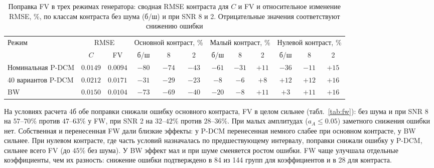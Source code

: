 \begin{table}[!ht]
\captionsetup{justification=raggedright}
\caption{Поправка FV в трех режимах генератора: сводная RMSE контраста для $C$ и FV и относительное изменение RMSE, \%, по классам контраста без шума (б/ш) и при SNR 8 и 2. Отрицательные значения соответствуют снижению ошибки}
\label{tab:fv}
\centering
\footnotesize
\setlength{\tabcolsep}{3pt}
\begin{tabular}{lccccccccccc}
\hline
\multirow{2}{*}{Режим} & \multicolumn{2}{c}{RMSE} & \multicolumn{3}{c}{Основной контраст, \%} & \multicolumn{3}{c}{Малый контраст, \%} & \multicolumn{3}{c}{Нулевой контраст, \%}\\
\cline{2-12}
 & $C$ & FV & б/ш & 8 & 2 & б/ш & 8 & 2 & б/ш & 8 & 2\\
\hline
Номинальная P-DCM & $0.0149$ & $0.0094$ & $-80$ & $-74$ & $-43$ & $-61$ & $-31$ & $+11$ & $-36$ & $-11$ & $+15$\\
40 вариантов P-DCM & $0.0212$ & $0.0171$ & $-31$ & $-29$ & $-23$ & $-8$ & $-6$ & $+8$ & $+12$ & $+12$ & $+16$\\
BW & $0.0150$ & $0.0104$ & $-73$ & $-69$ & $-40$ & $-20$ & $-8$ & $+11$ & $+3$ & $+11$ & $+16$\\
\hline
\end{tabular}
\end{table}

На условиях расчета 4б обе поправки снижали ошибку основного контраста, FV в целом сильнее (табл.~\ref{tab:fw}): без шума и при SNR 8 на $57$--$70\%$ против $47$--$63\%$ у FW, при SNR 2 на $32$--$42\%$ против $28$--$36\%$. При малых амплитудах ($a_A\le0.05$) заметного снижения ошибки нет. Собственная и перенесенная FW дали близкие эффекты: у P-DCM перенесенная немного слабее при основном контрасте, у BW сильнее. При нулевом контрасте, где часть условий назначалась по предшествующему интервалу, поправки снижали ошибку у P-DCM, сильнее всего FV (до $45\%$ без шума). У BW эффект мал и при шуме сменяется ростом ошибки. FW чаще улучшала отдельные коэффициенты, чем их разность: снижение ошибки подтверждено в 84 из 144 групп для коэффициентов и в 28 для контраста.

